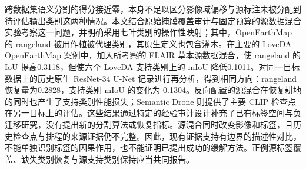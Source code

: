 跨数据集语义分割的得分接近零，本身不足以区分影像域偏移与源标注未被分配到待评估输出类别这两种情况。本文结合原始掩膜覆盖审计与固定预算的源数据混合实验考察这一问题，并明确采用七叶类别的操作性映射；其中，OpenEarthMap 的 rangeland 被用作植被代理类别，其原生定义也包含灌木。在主要的 LoveDA--OpenEarthMap 案例中，加入所考察的 FLAIR 草本源数据混合，使 rangeland 的 IoU 提高0.3118，但使六个 LoveDA 支持类别上的 mIoU 降低0.1011。对同一目标数据上的历史原生 ResNet-34 U-Net 记录进行再分析，得到相同方向：rangeland 恢复量为0.2828，支持类别 mIoU 的变化为-0.1304。反向配置的源混合在恢复耕地的同时也产生了支持类别性能损失；Semantic Drone 则提供了主要 CLIP 检查点在另一目标上的评估。这些结果通过特定的经验审计设计补充了已有标签空间与负迁移研究，没有提出新的分割算法或恢复指标。源混合同时改变影像和标签，且历史检查点与排程的来源证据仍不完整。因此，现有证据支持有边界的描述性对比，不能单独识别标签的因果作用，也不能证明已提出成功的缓解方法。正例源标签覆盖、缺失类别恢复与源支持类别保持应当共同报告。
